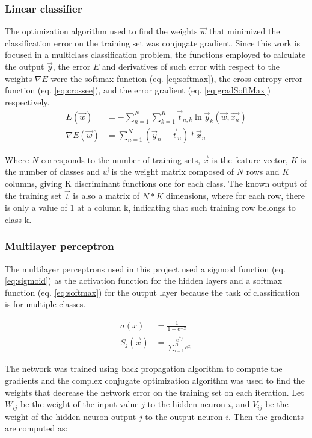 \documentclass{article}
\begin{document}
\subsubsection{Linear classifier}
The optimization algorithm used to find the weights $\vec{w}$ that minimized the classification error on the training 
set was conjugate gradient.
Since this work is focused in a multiclass classification problem, the functions employed to calculate the output $\vec{y}$, the error $E$
and derivatives of such error with respect to the weights $\nabla E$ were the softmax function (eq. \ref{eq:softmax}), 
the cross-entropy error function (eq. \ref{eq:crossee}), and the error gradient (eq. \ref{eq:gradSoftMax}) respectively.
\begin{align}
E(\vec{w}) &= -\sum_{n=1}^{N}{\sum_{k=1}^{K}{\vec{t}_{n,k} \ln \vec{y}_{k}(\vec{w},\vec{x_{n}})}} \label{eq:crossee} \\
\nabla E(\vec{w}) &=  \sum_{n=1}^{N}{(\vec{y}_{n} - \vec{t}_{n})*\vec{x}_{n}} \label{eq:gradSoftMax}
\end{align}

Where $N$ corresponds to the number of training sets, $\vec{x}$ is the feature vector, $K$ is the number of classes
and $\vec{w}$ is the weight matrix composed of $N$ rows and $K$ columns, giving K discriminant functions one for
each class. The known output of the training set $\vec{t}$ is also a matrix of $N * K$ dimensions, where for each row, 
there is only a value of 1 at a column k, indicating that such training row belongs to class k.

\subsubsection{Multilayer perceptron}
The multilayer perceptrons used in this project used a sigmoid function (eq. \ref{eq:sigmoid}) as the
activation function for the hidden layers and a softmax function (eq. \ref{eq:softmax}) for the output layer
because the task of classification is for multiple classes.

\begin{align}
\sigma(x) &= \frac{1}{1+e^{-x}} \label{eq:sigmoid} \\ 
S_j(\vec{x}) &= \frac{e^{x_j}}{\sum_{i=1}^D{e^{x_i}}} \label{eq:softmax}
\end{align}

The network was trained using back propagation algorithm to compute the gradients and the complex conjugate
optimization algorithm was used to find the weights that decrease the network error on the training set on
each iteration. Let $W_{ij}$ be the weight of the input value $j$ to the hidden neuron $i$, and $V_{ij}$ be
the weight of the hidden neuron output $j$ to the output neuron $i$. Then the gradients are computed as:
\end{document}
